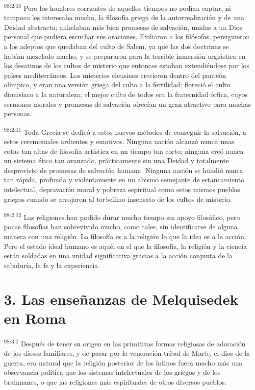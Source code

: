 \par
\textsuperscript{98:2.10} Pero los hombres corrientes de aquellos tiempos no podían captar, ni tampoco les interesaba mucho, la filosofía griega de la autorrealización y de una Deidad abstracta; anhelaban más bien promesas de salvación, unidas a un Dios personal que pudiera escuchar sus oraciones. Exiliaron a los filósofos, persiguieron a los adeptos que quedaban del culto de Salem, ya que las dos doctrinas se habían mezclado mucho, y se prepararon para la terrible inmersión orgiástica en los desatinos de los cultos de misterio que entonces estaban extendiéndose por los países mediterráneos. Los misterios eleusinos crecieron dentro del panteón olímpico, y eran una versión griega del culto a la fertilidad; floreció el culto dionisíaco a la naturaleza; el mejor culto de todos era la fraternidad órfica, cuyos sermones morales y promesas de salvación ofrecían un gran atractivo para muchas personas.

\par
\textsuperscript{98:2.11} Toda Grecia se dedicó a estos nuevos métodos de conseguir la salvación, a estos ceremoniales ardientes y emotivos. Ninguna nación alcanzó nunca unas cotas tan altas de filosofía artística en un tiempo tan corto; ninguna creó nunca un sistema ético tan avanzado, prácticamente sin una Deidad y totalmente desprovisto de promesas de salvación humana. Ninguna nación se hundió nunca tan rápida, profunda y violentamente en un abismo semejante de estancamiento intelectual, depravación moral y pobreza espiritual como estos mismos pueblos griegos cuando se arrojaron al torbellino insensato de los cultos de misterio.

\par
\textsuperscript{98:2.12} Las religiones han podido durar mucho tiempo sin apoyo filosófico, pero pocas filosofías han sobrevivido mucho, como tales, sin identificarse de alguna manera con una religión. La filosofía es a la religión lo que la idea es a la acción. Pero el estado ideal humano es aquél en el que la filosofía, la religión y la ciencia están soldadas en una unidad significativa gracias a la acción conjunta de la sabiduría, la fe y la experiencia.

\section*{3. Las enseñanzas de Melquisedek en Roma}
\par
\textsuperscript{98:3.1} Después de tener su origen en las primitivas formas religiosas de adoración de los dioses familiares, y de pasar por la veneración tribal de Marte, el dios de la guerra, era natural que la religión posterior de los latinos fuera mucho más una observancia política que los sistemas intelectuales de los griegos y de los brahmanes, o que las religiones más espirituales de otros diversos pueblos.

